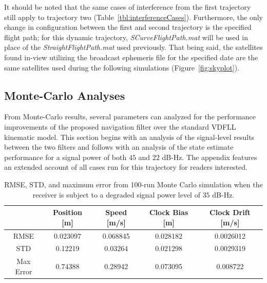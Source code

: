 It should be noted that the same cases of interference from the first trajectory still apply to trajectory two (Table~\ref{tbl:interferenceCases}). Furthermore, the only change in configuration between the first and second trajectory is the specified flight path; for this dynamic trajectory, \textit{SCurveFlightPath.mat} will be used in place of the \textit{StraightFlightPath.mat} used previously. That being said, the satellites found in-view utilizing the broadcast ephemeris file for the specified date are the same satellites used during the following simulations (Figure~\ref{fig:skyplot}).

\clearpage
\subsection{\textbf{Monte-Carlo Analyses}}
From Monte-Carlo results, several parameters can analyzed for the performance improvements of the proposed navigation filter over the standard VDFLL kinematic model. This section begins with an analysis of the signal-level results between the two filters and follows with an analysis of the state estimate performance for a signal power of both \(45\) and \(22\) dB-Hz. The appendix features an extended account of all cases run for this trajectory for readers interested.

\begin{table}[!ht]
    \caption{RMSE, STD, and maximum error from 100-run Monte Carlo simulation when the receiver is subject to a degraded signal power level of \(35\) dB-Hz.}\label{tbl:dyn35FVDM}
    \centering
    \begin{tabular}{ccccc}
        \toprule
                  & Position [m] & Speed [m/s] & Clock Bias [m] & Clock Drift [m/s] \\
        \midrule
        RMSE      & 0.023097     & 0.068845    & 0.028182       & 0.0026012         \\
        STD       & 0.12219      & 0.03264     & 0.021298       & 0.0029319         \\
        Max Error & 0.74388      & 0.28942     & 0.073095       & 0.008722          \\
        \bottomrule
    \end{tabular}
\end{table}

